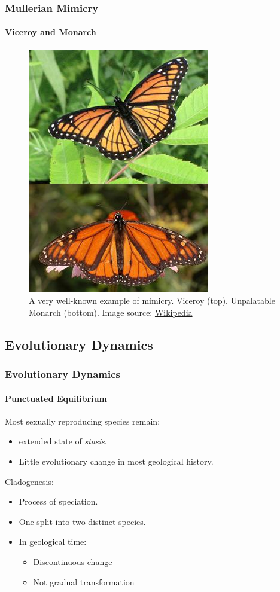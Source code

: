 \frame
{
	\frametitle{Mullerian Mimicry}
	\framesubtitle{Viceroy and Monarch}

	\begin{figure}[H]
		\centering
		\includegraphics[scale=0.5]{../tex/images/BatesMimButter}
		\caption{A very well-known example of mimicry. Viceroy (top). Unpalatable Monarch (bottom). Image source: \href{http://en.wikipedia.org/wiki/Mullerian_mimicry}{Wikipedia}}
		\label{fig:mullerian-butterfly}
	\end{figure}

}

\subsection{Evolutionary Dynamics}

\frame
{
	\frametitle{Evolutionary Dynamics}
	\framesubtitle{Punctuated Equilibrium}

	Most sexually reproducing species remain:
	\begin{itemize}
		\item extended state of \textit{stasis}.
		\item Little evolutionary change in most geological history.
	\end{itemize}
	
	Cladogenesis:
	\begin{itemize}
		\item Process of speciation.
		\item One split into two distinct species.
		\item In geological time:
			\begin{itemize}
				\item Discontinuous change
				\item Not gradual transformation
			\end{itemize}
	\end{itemize}
}

